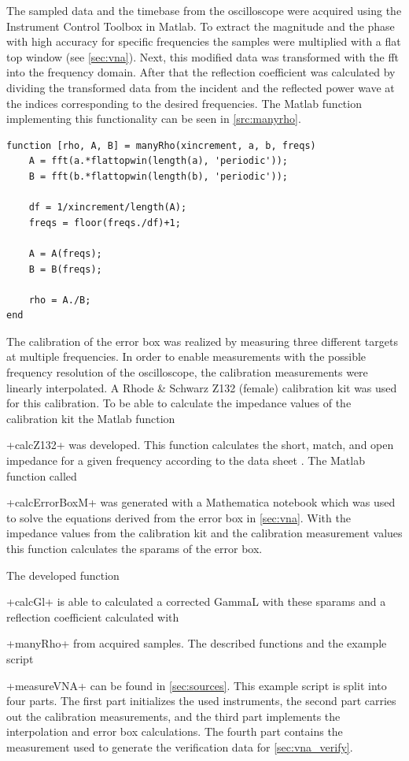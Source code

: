 \documentclass[12pt,a4paper,parskip=full,abstract=true,BCOR=12mm,twoside,open=right]{scrreprt}
\newcommand{\hack}{}
\newcommand*{\SavedLstInline}{}
\DeclareRobustCommand*{\lstinline}{%
  \ifmmode
    \let\SavedBGroup\bgroup
    \def\bgroup{%
      \let\bgroup\SavedBGroup
      \hbox\bgroup
    }%
  \fi
  \SavedLstInline
}
\begin{document}
The sampled data and the timebase from the oscilloscope were acquired using the
Instrument Control Toolbox in Matlab. To extract the magnitude and the phase
with high accuracy for specific frequencies the samples were multiplied with
a flat top window (see \cref{sec:vna}). Next, this modified data was transformed
with the \gls{fft} into the frequency domain. After that the reflection coefficient
was calculated by dividing the transformed data from the incident and the reflected
power wave at the indices corresponding to the desired frequencies. The Matlab
function implementing this functionality can be seen in \cref{src:manyrho}.

\begin{lstlisting}[float=htb,caption={Function for calculating $\frac{\gls{a}}{\gls{b}}$ from sampled data at multiple frequencies},label=src:manyrho,basicstyle=\hack\scriptsize]
function [rho, A, B] = manyRho(xincrement, a, b, freqs)
    A = fft(a.*flattopwin(length(a), 'periodic'));
    B = fft(b.*flattopwin(length(b), 'periodic'));

    df = 1/xincrement/length(A);
    freqs = floor(freqs./df)+1;

    A = A(freqs);
    B = B(freqs);

    rho = A./B;
end
\end{lstlisting}

The calibration of the error box was realized by measuring three different targets
at multiple frequencies. In order to enable measurements with the possible
frequency resolution of the oscilloscope, the calibration measurements were
linearly interpolated. A Rhode \& Schwarz Z132 (female) calibration kit was used
for this calibration. To be able to calculate the impedance values of the
calibration kit the Matlab function \lstinline+calcZ132+ was developed. This function
calculates the short, match, and open impedance for a given frequency according to
the data sheet \cite{zv-z132}. The Matlab function called \lstinline+calcErrorBoxM+ was
generated with a Mathematica notebook which was used to solve the equations
derived from the error box in \cref{sec:vna}. With the impedance values from
the calibration kit and the calibration measurement values this function calculates
the \glspl{sparam} of the error box.

The developed function \lstinline+calcGl+ is able to calculated a corrected \gls{GammaL}
with these \glspl{sparam} and a reflection coefficient calculated with \lstinline+manyRho+
from acquired samples. The described functions and the example script \lstinline+measureVNA+
can be found in \cref{sec:sources}. This example script is split into four parts. The
first part initializes the used instruments, the second part carries out the
calibration measurements, and the third part implements the interpolation
and error box calculations. The fourth part contains the measurement used to generate
the verification data for \cref{sec:vna_verify}.
\end{document}
